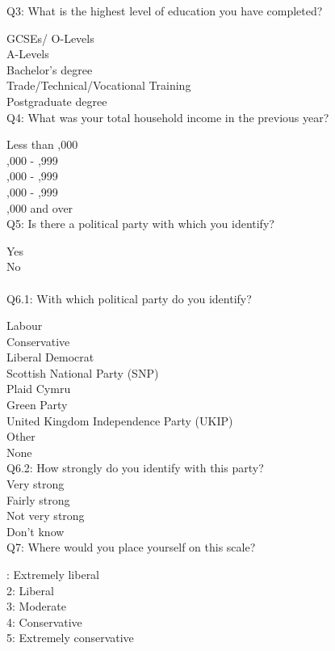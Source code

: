 \documentclass[11pt]{article}
\begin{document}
\noindent Q3: What is the highest level of education you have completed?

\noindent GCSEs/ O-Levels\\
A-Levels\\
Bachelor’s degree\\
Trade/Technical/Vocational Training\\
Postgraduate degree\\

\noindent Q4: What was your total household income in the previous year?

\noindent Less than ,000\\
,000 - ,999\\
,000 - ,999\\
,000 - ,999\\
,000 and over\\

\noindent Q5: Is there a political party with which you identify?

\noindent Yes\\
No\\

\\

\noindent Q6.1: With which political party do you identify?

\noindent Labour\\
Conservative\\
Liberal Democrat\\
Scottish National Party (SNP)\\
Plaid Cymru\\
Green Party\\
United Kingdom Independence Party (UKIP)\\
Other\\
None\\

\noindent Q6.2: How strongly do you identify with this party?\\
\noindent Very strong\\
Fairly strong\\
Not very strong\\
Don’t know\\

\noindent Q7: Where would you place yourself on this scale?

: Extremely liberal\\
2: Liberal\\
3: Moderate\\
4: Conservative\\
5: Extremely conservative\\
\end{document}
